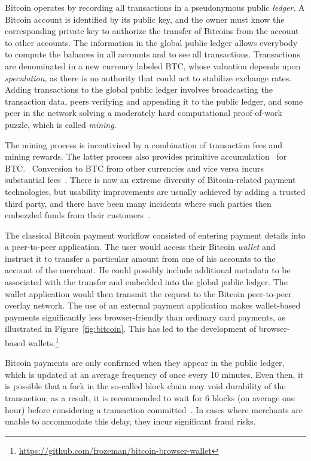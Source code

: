 \documentclass{llncs}
\begin{document}
Bitcoin operates by recording all transactions in a pseu\-do\-ny\-mous
public {\em ledger}.  A Bitcoin account is identified by its public
key, and the owner must know the corresponding private key to
authorize the transfer of Bitcoins from the account to other accounts.
The information in the global public ledger allows everybody to
compute the balances in all accounts and to see all transactions.
Transactions are denominated in a new currency labeled BTC, whose
valuation depends upon {\em speculation}, as there is no authority
that could act to stabilize exchange rates.  Adding transactions to
the global public ledger involves broadcasting the transaction data,
peers verifying and appending it to the public ledger, and some peer
in the network solving a moderately hard computational proof-of-work
puzzle, which is called {\em mining}.

The mining process is incentivised by a combination of transaction
fees and mining rewards. The latter process also provides primitive
accumulation~\cite{primitiveacc} for BTC.~\cite{nakamoto2008bitcoin}
Conversion to BTC from other currencies and vice versa incurs
substantial fees~\cite{BTCfees}.  There is now an extreme diversity of
Bitcoin-related payment technologies, but usability improvements are
usually achieved by adding a trusted third party, and there have been
many incidents where such parties then embezzled funds from their
customers~\cite{BTC:demise}.

The classical Bitcoin payment workflow consisted of entering payment
details into a peer-to-peer application.  The user would access their
Bitcoin {\em wallet} and instruct it to transfer a particular amount
from one of his accounts to the account of the merchant. He could
possibly include additional metadata to be associated with the
transfer and embedded into the global public ledger.  The wallet
application would then transmit the request to the Bitcoin
peer-to-peer overlay network.  The use of an external payment
application makes wallet-based payments significantly less
browser-friendly than ordinary card payments, as illustrated in
Figure~\ref{fig:bitcoin}. This has led to the development of
browser-based
wallets.\footnote{\url{https://github.com/frozeman/bitcoin-browser-wallet}}

Bitcoin payments are only confirmed when they appear in the public
ledger, which is updated at an average frequency of once every 10
minutes.  Even then, it is possible that a fork in the so-called block
chain may void durability of the transaction; as a result, it is
recommended to wait for 6 blocks (on average one hour) before
considering a transaction committed~\cite{nakamoto2008bitcoin}.  In
cases where merchants are unable to accommodate this delay, they incur
significant fraud risks.
\end{document}
